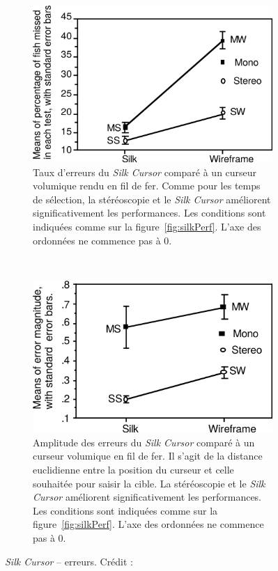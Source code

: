 	\begin{figure}[!htb]
		\begin{subfigure}[t]{0.49\textwidth}
			\centering
			\includegraphics[width=\textwidth]{figures/ch2/silkErrors}
			\caption{Taux d'erreurs du \emph{Silk Cursor} comparé à un curseur volumique rendu en fil de fer. Comme pour les temps de sélection, la stéréoscopie et le \emph{Silk Cursor} améliorent significativement les performances. Les conditions sont indiquées comme sur la figure~\ref{fig:silkPerf}. L'axe des ordonnées ne commence pas à 0.}
			\label{fig:silkErrors}
		\end{subfigure}
		~
		\begin{subfigure}[t]{0.49\textwidth}
			\centering
			\includegraphics[width=\textwidth]{figures/ch2/silkErrorMag}
			\caption{Amplitude des erreurs du \emph{Silk Cursor} comparé à un curseur volumique en fil de fer. Il s'agit de la distance euclidienne entre la position du curseur et celle souhaitée pour saisir la cible. La stéréoscopie et le \emph{Silk Cursor} améliorent significativement les performances. Les conditions sont indiquées comme sur la figure~\ref{fig:silkPerf}. L'axe des ordonnées ne commence pas à 0.}
			\label{fig:silkErrorMag}
		\end{subfigure}
		\caption[\emph{Silk Cursor} -- erreurs]{\emph{Silk Cursor} -- erreurs. Crédit : \cite{zhai1994silk}}
		\label{fig:SilkErrorsErrMag}
	\end{figure}
	
